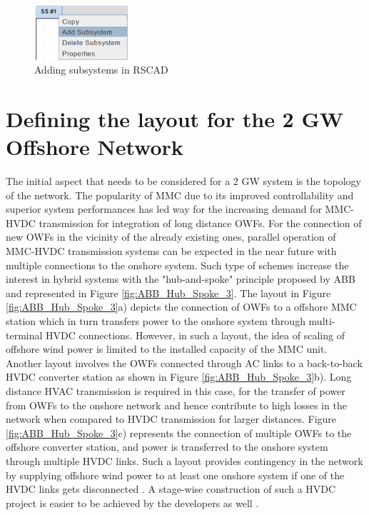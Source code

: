 \begin{figure}[H]
\centering
    \includegraphics[height = 2cm,width = 3.5cm]{Diagrams/Chapter_3/Subsystem.PNG}
    \caption{Adding subsystems in RSCAD}
    \label{fig:subsystem_RSCAD}
\end{figure}


\section{Defining the layout for the 2 GW Offshore Network}
The initial aspect that needs to be considered for a 2 GW system is the topology of the network. The popularity of \gls{MMC} due to its improved controllability and superior system performances has led way for the increasing demand for \gls{MMC}-\gls{HVDC} transmission for integration of long distance \gls{OWF}s. For the connection of new \gls{OWF}s in the vicinity of the already existing ones, parallel operation of \gls{MMC}-\gls{HVDC} transmission systems can be expected in the near future with multiple connections to the onshore system. Such type of schemes increase the interest in hybrid systems with the "hub-and-spoke" principle proposed by ABB \cite{abb_hvdc_2018} and represented in Figure \ref{fig:ABB_Hub_Spoke_3}. The layout in Figure \ref{fig:ABB_Hub_Spoke_3}a) depicts the connection of \gls{OWF}s to a offshore \gls{MMC} station which in turn transfers power to the onshore system through multi-terminal \gls{HVDC} connections. However, in such a layout, the idea of scaling of offshore wind power is limited to the installed capacity of the \gls{MMC} unit. Another layout involves the \gls{OWF}s connected through \gls{AC} links to a back-to-back \gls{HVDC} converter station as shown in Figure \ref{fig:ABB_Hub_Spoke_3}b). Long distance \gls{HVAC} transmission is required in this case, for the transfer of power from \gls{OWF}s to the onshore network and hence contribute to high losses in the network when compared to \gls{HVDC} transmission for larger distances. Figure \ref{fig:ABB_Hub_Spoke_3}c) represents the connection of multiple \gls{OWF}s to the offshore converter station, and power is transferred to the onshore system through multiple \gls{HVDC} links. Such a layout provides contingency in the network by supplying offshore wind power to at least one onshore system if one of the \gls{HVDC} links gets disconnected \cite{lescale2012parallelling}. A stage-wise construction of such a \gls{HVDC} project is easier to be achieved by the developers as well \cite{irnawan2019planning}.

